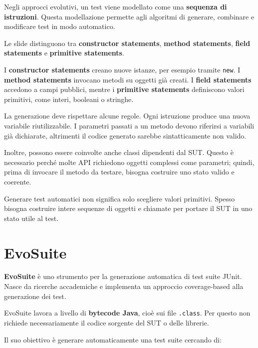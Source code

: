 Negli approcci evolutivi, un test viene modellato come una \textbf{sequenza di istruzioni}. Questa modellazione permette agli algoritmi di generare, combinare e modificare test in modo automatico.

\begin{notaslide}
Le slide distinguono tra \textbf{constructor statements}, \textbf{method statements}, \textbf{field statements} e \textbf{primitive statements}.
\end{notaslide}

I \textbf{constructor statements} creano nuove istanze, per esempio tramite \texttt{new}. I \textbf{method statements} invocano metodi su oggetti già creati. I \textbf{field statements} accedono a campi pubblici, mentre i \textbf{primitive statements} definiscono valori primitivi, come interi, booleani o stringhe.

La generazione deve rispettare alcune regole. Ogni istruzione produce una nuova variabile riutilizzabile. I parametri passati a un metodo devono riferirsi a variabili già dichiarate, altrimenti il codice generato sarebbe sintatticamente non valido.

Inoltre, possono essere coinvolte anche classi dipendenti dal SUT. Questo è necessario perché molte API richiedono oggetti complessi come parametri; quindi, prima di invocare il metodo da testare, bisogna costruire uno stato valido e coerente.

\begin{notaesame}
Generare test automatici non significa solo scegliere valori primitivi. Spesso bisogna costruire intere sequenze di oggetti e chiamate per portare il SUT in uno stato utile al test.
\end{notaesame}

\section{EvoSuite}

\textbf{EvoSuite} è uno strumento per la generazione automatica di test suite JUnit. Nasce da ricerche accademiche e implementa un approccio coverage-based alla generazione dei test.

\begin{notaslide}
EvoSuite lavora a livello di \textbf{bytecode Java}, cioè sui file \texttt{.class}. Per questo non richiede necessariamente il codice sorgente del SUT o delle librerie.
\end{notaslide}

Il suo obiettivo è generare automaticamente una test suite cercando di:

